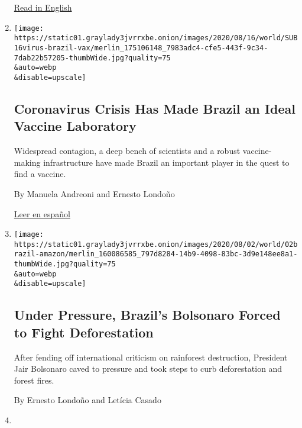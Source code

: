 \begin{enumerate}
  \href{https://www.nytimes3xbfgragh.onion/2020/08/15/world/americas/brazil-coronavirus-vaccine.html}{Read
  in English}
\item
  \href{/2020/08/15/world/americas/brazil-coronavirus-vaccine.html}{}

  \texttt{[image: https://static01.graylady3jvrrxbe.onion/images/2020/08/16/world/SUB16virus-brazil-vax/merlin\_175106148\_7983adc4-cfe5-443f-9c34-7dab22b57205-thumbWide.jpg?quality=75\\\&auto=webp\\\&disable=upscale]}

  \hypertarget{coronavirus-crisis-has-made-brazil-an-ideal-vaccine-laboratory}{%
  \subsection{Coronavirus Crisis Has Made Brazil an Ideal Vaccine
  Laboratory}\label{coronavirus-crisis-has-made-brazil-an-ideal-vaccine-laboratory}}

  Widespread contagion, a deep bench of scientists and a robust
  vaccine-making infrastructure have made Brazil an important player in
  the quest to find a vaccine.

  By Manuela Andreoni and Ernesto Londoño

  \href{https://www.nytimes3xbfgragh.onion/es/2020/08/17/espanol/america-latina/vacuna-coronavirus-brasil.html}{Leer
  en español}
\item
  \href{/2020/08/01/world/americas/Brazil-amazon-deforestation-bolsonaro.html}{}

  \texttt{[image: https://static01.graylady3jvrrxbe.onion/images/2020/08/02/world/02brazil-amazon/merlin\_160086585\_797d8284-14b9-4098-83bc-3d9e148ee8a1-thumbWide.jpg?quality=75\\\&auto=webp\\\&disable=upscale]}

  \hypertarget{under-pressure-brazils-bolsonaro-forced-to-fight-deforestation}{%
  \subsection{Under Pressure, Brazil's Bolsonaro Forced to Fight
  Deforestation}\label{under-pressure-brazils-bolsonaro-forced-to-fight-deforestation}}

  After fending off international criticism on rainforest destruction,
  President Jair Bolsonaro caved to pressure and took steps to curb
  deforestation and forest fires.

  By Ernesto Londoño and Letícia Casado
\item
  \href{/2020/07/31/world/americas/brazil-trump-ethanol-chapman.html}{}


\end{enumerate}
